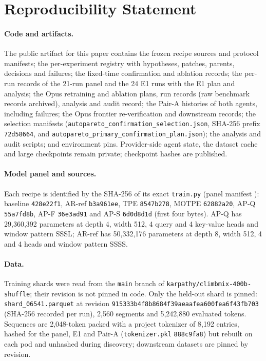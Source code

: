 \documentclass{article}
\newif\ifshowhumanmarkers \showhumanmarkersfalse
\newcommand{\releasepending}{\ifshowhumanmarkers{\color{humanframe}\sffamily\scriptsize\bfseries[RELEASE PENDING]}\ \fi}
\begin{document}
\section{Reproducibility Statement}\label{app:repro}
\paragraph{Code and artifacts.} \releasepending The public artifact for this paper contains the frozen recipe sources and protocol manifests; the per-experiment registry with hypotheses, patches, parents, decisions and failures; the fixed-time confirmation and ablation records; the per-run records of the 21-run panel and the 24 E1 runs with the E1 plan and analysis; the Opus retraining and ablation plans, run records (raw benchmark records archived), analysis and audit record; the Pair-A histories of both agents, including failures; the Opus frontier re-verification and downstream records; the selection manifests (\texttt{autopareto\_confirmation\_selection.json}, SHA-256 prefix \texttt{72d58664}, and \texttt{autopareto\_primary\_confirmation\_plan.json}); the analysis and audit scripts; and environment pins. Provider-side agent state, the dataset cache and large checkpoints remain private; checkpoint hashes are published.

\paragraph{Model panel and sources.} Each recipe is identified by the SHA-256 of its exact \texttt{train.py} (panel manifest ): baseline \texttt{428e22f1}, AR-ref \texttt{b3a961ee}, TPE \texttt{8547b278}, MOTPE \texttt{62882a20}, AP-Q \texttt{55a7fd8b}, AP-F \texttt{36e3ad91} and AP-S \texttt{6d0d8d1d} (first four bytes). AP-Q has 29,360,392 parameters at depth 4, width 512, 4 query and 4 key-value heads and window pattern SSSL; AR-ref has 50,332,176 parameters at depth 8, width 512, 4 and 4 heads and window pattern SSSS.

\paragraph{Data.} Training shards were read from the \texttt{main} branch of \texttt{karpathy/climbmix-400b-shuffle}; their revision is not pinned in code. Only the held-out shard is pinned: \texttt{shard\_06541.parquet} at revision \texttt{915333b4f8b8684f39aeaafea600fea6f43fb703} (SHA-256 recorded per run), 2,560 segments and 5,242,880 evaluated tokens. Sequences are 2,048-token packed with a project tokenizer of 8,192 entries, hashed for the panel, E1 and Pair-A (\texttt{tokenizer.pkl} \texttt{888c9fa8}) but rebuilt on each pod and unhashed during discovery; downstream datasets are pinned by revision.
\end{document}
